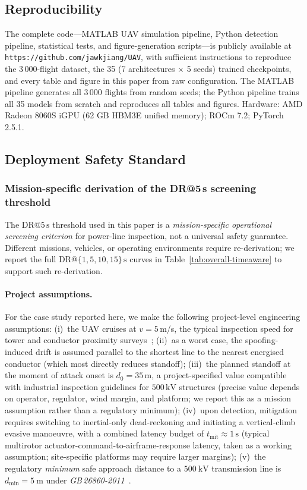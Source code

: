 \documentclass{ieeeaccess}
\begin{document}
\subsection{Reproducibility}
\label{sec:reproducibility}

The complete code---MATLAB UAV simulation pipeline, Python detection
pipeline, statistical tests, and figure-generation scripts---is publicly
available at \texttt{https://github.com/jawkjiang/UAV}, with sufficient
instructions to reproduce the 3\,000-flight dataset, the 35
(7 architectures $\times$ 5 seeds) trained checkpoints, and every
table and figure in this paper from raw configuration.
The MATLAB pipeline generates all 3\,000 flights from random seeds; the
Python pipeline trains all 35 models from scratch and reproduces all
tables and figures.
Hardware: AMD Radeon 8060S iGPU (62 GB HBM3E unified memory); ROCm 7.2;
PyTorch 2.5.1.

\subsection{Deployment Safety Standard}
\label{sec:deployability_standard}

\subsubsection{Mission-specific derivation of the DR@5\,s screening threshold}

The DR@$5\,\text{s}$ threshold used in this paper is a \emph{mission-specific
operational screening criterion} for power-line inspection, not a universal
safety guarantee. Different missions, vehicles, or operating environments
require re-derivation; we report the full DR@$\{1, 5, 10, 15\}\,\text{s}$
curves in Table~\ref{tab:overall-timeaware} to support such re-derivation.

\paragraph{Project assumptions.}
For the case study reported here, we make the following project-level
engineering assumptions:
(i)~the UAV cruises at $v=5$\,m/s, the typical inspection speed for tower
and conductor proximity surveys~\cite{ref29};
(ii)~as a worst case, the spoofing-induced drift is assumed parallel to the
shortest line to the nearest energised conductor (which most directly
reduces standoff);
(iii)~the planned standoff at the moment of attack onset is
$d_0 = 35\,\text{m}$, a project-specified value compatible with industrial
inspection guidelines for $500\,\text{kV}$ structures (precise value depends
on operator, regulator, wind margin, and platform; we report this as a
mission assumption rather than a regulatory minimum);
(iv)~upon detection, mitigation requires switching to inertial-only
dead-reckoning and initiating a vertical-climb evasive manoeuvre, with a
combined latency budget of $t_{\text{mit}} \approx 1\,\text{s}$ (typical
multirotor actuator-command-to-airframe-response latency, taken as a
working assumption; site-specific platforms may require larger margins);
(v)~the regulatory \emph{minimum} safe approach distance to a
$\SI{500}{\kV}$ transmission line is $d_{\min}=\SI{5}{\metre}$ under
\emph{GB\,26860-2011}~\cite{ref30}.
\end{document}
